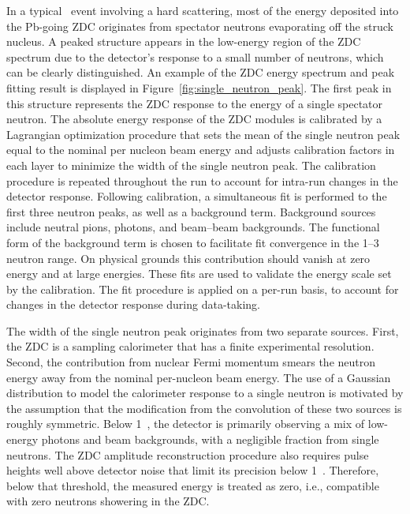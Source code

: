 \documentclass[PAPER, atlasdraft=false, USenglish, cernpreprint]{atlasdoc}
\begin{document}
In a typical \pxPb\ event involving a hard scattering, most of the energy deposited into the Pb-going ZDC originates from spectator neutrons evaporating off the struck nucleus.
A peaked structure appears in the low-energy region of the ZDC spectrum due to the detector's response to a small number of neutrons, which can be clearly distinguished. 
An example of the ZDC energy spectrum and peak fitting result is displayed in Figure~\ref{fig:single_neutron_peak}.
The first peak in this structure represents the ZDC response to the energy of a single spectator neutron. 
The absolute energy response of the ZDC modules is calibrated by a Lagrangian optimization procedure that sets the mean of the single neutron peak equal to the nominal per nucleon beam energy and adjusts calibration factors in each layer to minimize the width of the single neutron peak.  
The calibration procedure is repeated throughout the run to account for intra-run changes in the detector response. 
Following calibration, a simultaneous fit is performed to the first three neutron peaks, as well as a background term.
Background sources include neutral pions, photons, and beam--beam backgrounds. 
The functional form of the background term is chosen to facilitate fit convergence in the 1--3 neutron range. 
On physical grounds this contribution should vanish at zero energy and at large energies.  
These fits are used to validate the energy scale set by the calibration.
The fit procedure is applied on a per-run basis, to account for changes in the detector response during data-taking. 




The width of the single neutron peak originates from two separate sources.  
First, the ZDC is a sampling calorimeter that has a finite experimental resolution. Second, the contribution from nuclear Fermi momentum smears the neutron energy away from the nominal per-nucleon beam energy.  
The use of a Gaussian distribution to model the calorimeter response to a single neutron is motivated by the assumption that the modification from the convolution of these two sources is roughly symmetric. 
Below 1~\TeV, the detector is primarily observing a mix of low-energy photons and beam backgrounds, with a negligible fraction from single neutrons. The ZDC amplitude reconstruction procedure also requires pulse heights well above detector noise that limit its precision below 1~\TeV. Therefore, below that threshold, the measured energy is treated as zero, i.e., compatible with zero neutrons showering in the ZDC.
\end{document}
